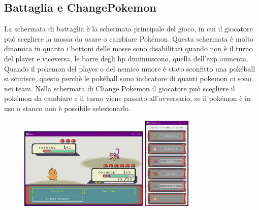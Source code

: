 \documentclass[12pt]{article}
\begin{document}
\subsection{Battaglia e ChangePokemon}
La schermata di battaglia è la schermata principale del gioco, in cui il giocatore può scegliere la mossa da usare o cambiare Pokémon.
Questa schermata è molto dinamica in quanto i bottoni delle mosse sono disabilitati quando non è il turno del player e viceversa, le barre degli hp diminuiscono, quella dell'exp aumenta.
Quando il pokemon del player o del nemico muore è stato sconfitto una pokéball si scurisce, questo perchè le pokéball sono indicatore di quanti pokemon ci sono nei team.
Nella schermata di Change Pokemon il giocatore può scegliere il pokémon da cambiare e il turno viene passato all'avversario, se il pokémon è in uso o stanco non è possibile selezionarlo.
\begin{figure}[h]
    \centering
    \includegraphics[width=0.55\textwidth]{Images/bsttle.png}
    \includegraphics[width=0.20\textwidth]{Images/changepoke.png}
\end{figure}
\newpage
\end{document}
